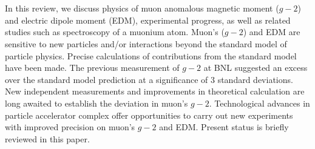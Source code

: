 \section{}
In this review, we discuss physics of muon anomalous magnetic moment ($g-2$) and electric dipole moment (EDM),
experimental progress, as well as related studies such as spectroscopy of a muonium atom. Muon's ($g-2$) and 
EDM are sensitive to new particles and/or interactions beyond the standard model of particle physics. 
Precise calculations of contributions from the standard model have been made. The previous measurement 
of $g-2$ at BNL suggested an excess over the standard model prediction at a significance of 3 standard 
deviations. New independent measurements and improvements in theoretical calculation are long awaited 
to establish the deviation in muon’s $g-2$. Technological advances in particle accelerator complex offer 
opportunities to carry out new experiments with improved precision on muon’s $g-2$ and EDM. 
Present status is briefly reviewed in this paper.
